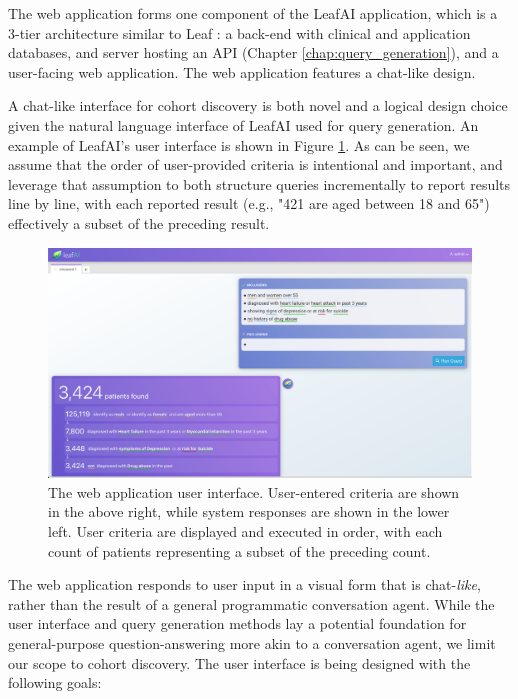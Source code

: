 \documentclass[../main.tex]{subfiles}
\begin{document}
The web application forms one component of the LeafAI application, which is a 3-tier architecture similar to Leaf \cite{dobbins2019leaf}: a back-end with clinical and application databases, and server hosting an API (Chapter \ref{chap:query_generation}), and a user-facing web application. The web application features a chat-like design.

A chat-like interface for cohort discovery is both novel and a logical design choice given the natural language interface of LeafAI used for query generation. An example of LeafAI's user interface is shown in Figure \ref{fig_leafai_demo}. As can be seen, we assume that the order of user-provided criteria is intentional and important, and leverage that assumption to both structure queries incrementally to report results line by line, with each reported result (e.g., "421 are aged between 18 and 65") effectively a subset of the preceding result.

\begin{figure}[h!]
  \includegraphics[scale=0.28]{Figures/8_web_application/leafai_demo.png}  
  \caption{The web application user interface. User-entered criteria are shown in the above right, while system responses are shown in the lower left. User criteria are displayed and executed in order, with each count of patients representing a subset of the preceding count.}
\label{fig_leafai_demo}
\end{figure}

The web application responds to user input in a visual form that is chat-\textit{like}, rather than the result of a general programmatic conversation agent. While the user interface and query generation methods lay a potential foundation for general-purpose question-answering more akin to a conversation agent, we limit our scope to cohort discovery. The user interface is being designed with the following goals:
\end{document}
